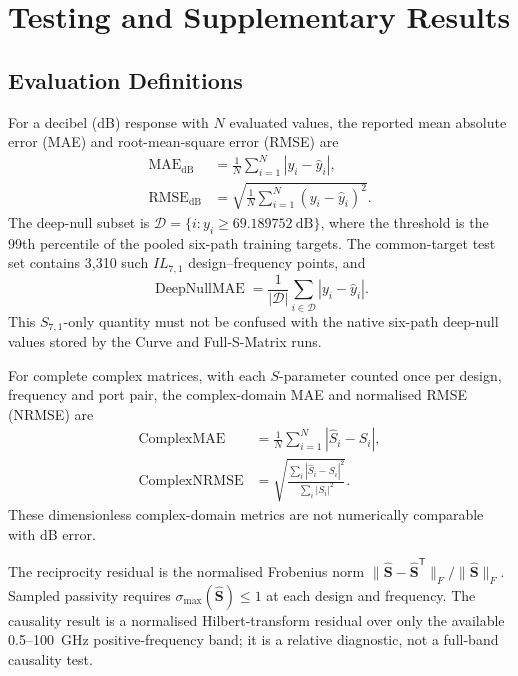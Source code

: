 \section{Testing and Supplementary Results}
\label{app:testing-results}

\subsection{Evaluation Definitions}
For a decibel (dB) response with $N$ evaluated values, the reported mean
absolute error (MAE) and root-mean-square error (RMSE) are
\begin{align}
    \operatorname{MAE}_{\mathrm{dB}}
      &=\frac{1}{N}\sum_{i=1}^{N}|y_i-\widehat{y}_i|, \\
    \operatorname{RMSE}_{\mathrm{dB}}
      &=\sqrt{\frac{1}{N}\sum_{i=1}^{N}(y_i-\widehat{y}_i)^2}.
    \label{eq:appendix-db-errors}
\end{align}
The deep-null subset is
$\mathcal{D}=\{i:y_i\geq69.189752\ \mathrm{dB}\}$, where the threshold is the
99th percentile of the pooled six-path training targets. The common-target test
set contains 3,310 such $IL_{7,1}$ design--frequency points, and
\begin{equation}
    \operatorname{DeepNullMAE}
      =\frac{1}{|\mathcal{D}|}
       \sum_{i\in\mathcal{D}}|y_i-\widehat{y}_i|.
    \label{eq:appendix-deep-null}
\end{equation}
This $S_{7,1}$-only quantity must not be confused with the native six-path
deep-null values stored by the Curve and Full-S-Matrix runs.

For complete complex matrices, with each $S$-parameter counted once per design,
frequency and port pair, the complex-domain MAE and normalised RMSE (NRMSE) are
\begin{align}
    \operatorname{ComplexMAE}
      &=\frac{1}{N}\sum_{i=1}^{N}
        |\widehat{S}_i-S_i|, \\
    \operatorname{ComplexNRMSE}
      &=\sqrt{\frac{\sum_i|\widehat{S}_i-S_i|^2}
                         {\sum_i|S_i|^2}}.
    \label{eq:appendix-complex-errors}
\end{align}
These dimensionless complex-domain metrics are not numerically comparable with
dB error.

The reciprocity residual is the normalised Frobenius norm
$\|\widehat{\mathbf S}-\widehat{\mathbf S}^{\mathsf T}\|_F/
\|\widehat{\mathbf S}\|_F$. Sampled passivity requires
$\sigma_{\max}(\widehat{\mathbf S})\leq1$ at each design and frequency. The
causality result is a normalised Hilbert-transform residual over only the
available 0.5--100~GHz positive-frequency band; it is a relative diagnostic,
not a full-band causality test.

